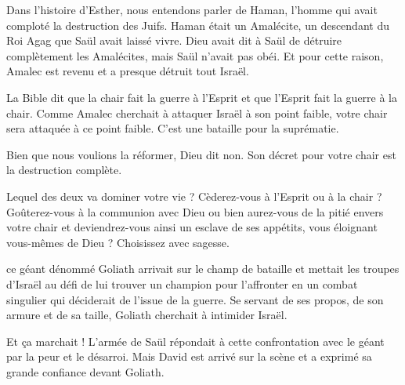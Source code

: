 Dans l'histoire d'Esther, nous entendons parler de Haman,
 l'homme qui avait comploté la destruction des Juifs.
 Haman était un Amalécite, un descendant du Roi Agag que Saül
 avait laissé vivre.
 Dieu avait dit à Saül de \og détruire complètement \fg{} les Amalécites,
 mais Saül n'avait pas obéi.
 Et pour cette raison, Amalec est revenu et a presque détruit tout Israël.

La Bible dit que la chair fait la guerre à l'Esprit et que l'Esprit
 fait la guerre à la chair.
 Comme Amalec cherchait à attaquer Israël à son point faible,
 votre chair sera attaquée à ce point faible.
 C'est une bataille pour la suprématie.


Bien que nous voulions la réformer, Dieu dit non.
 Son décret pour votre chair est la destruction complète.

Lequel des deux va dominer votre vie ?
 Cèderez-vous à l'Esprit ou à la chair ?
 Goûterez-vous à la communion avec Dieu ou bien aurez-vous
 de la pitié envers votre chair et deviendrez-vous ainsi
 un esclave de ses appétits, vous éloignant vous-mêmes de Dieu ?
 Choisissez avec sagesse. 

\dvrule






 ce géant dénommé Goliath arrivait
 sur le champ de bataille et mettait les troupes d'Israël
 au défi de lui trouver un champion pour l'affronter
 en un combat singulier qui déciderait de l'issue de la guerre.
 Se servant de ses propos, de son armure et de sa taille,
 Goliath cherchait à intimider Israël. 

Et ça marchait ! L'armée de Saül répondait à cette confrontation
 avec le géant par la peur et le désarroi.
 Mais David est arrivé sur la scène et a exprimé
 sa grande confiance devant Goliath.

